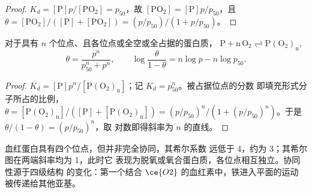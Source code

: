 \begin{proof}
$K_d = [\mathrm P]p/[\mathrm{PO_2}] = p_{50}$，故 $[\mathrm{PO_2}] = [\mathrm P]p/p_{50}$，且 $\theta = [\mathrm{PO_2}]/([\mathrm P] + [\mathrm{PO_2}]) = (p/p_{50})/(1 + p/p_{50})$。
\end{proof}

\begin{theorem}[希尔方程]\label{thm:b3:bioinorganic:hill}
对于具有 $n$ 个位点、且各位点或全空或全占据的蛋白质，
$\mathrm{P + n\,O_2 \rightleftharpoons P(O_2)_n}$,
\[
  \theta = \frac{p^n}{p_{50}^n + p^n}, \qquad \log\frac{\theta}{1 - \theta} = n\log p - n\log p_{50}.
\]
\end{theorem}

\begin{proof}
$K_d = [\mathrm P]p^n/[\mathrm{P(O_2)_n}]$；记 $K_d = p_{50}^n$。被占据位点的分数
即填充形式分子所占的比例，$\theta = [\mathrm{P(O_2)_n}]/([\mathrm P] + [\mathrm{P(O_2)_n}]) = (p/p_{50})^n/(1 + (p/p_{50})^n)$。于是 $\theta/(1 - \theta) = (p/p_{50})^n$，取
对数即得斜率为 $n$ 的直线。
\end{proof}

血红蛋白具有四个位点，但并非完全协同，其希尔系数
远低于 4，约为 3；其希尔图在两端斜率均为 1，此时它
表现为脱氧或氧合蛋白质，各位点相互独立。协同性源于四级结构
的变化：第一个结合 $\ce{O2}$ 的血红素中，铁进入平面的运动
被传递给其他亚基。

